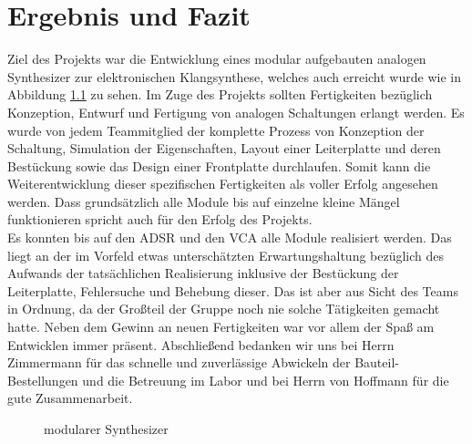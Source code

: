 \chapter{Ergebnis und Fazit}\label{ch:fazit}
Ziel des Projekts war die Entwicklung eines modular aufgebauten analogen Synthesizer zur elektronischen Klangsynthese, welches auch erreicht wurde wie in Abbildung \ref{fig:modularer Synthesizer} zu sehen.
Im Zuge des Projekts sollten Fertigkeiten bezüglich Konzeption, Entwurf und Fertigung von analogen Schaltungen erlangt werden.
Es wurde von jedem Teammitglied der komplette Prozess von Konzeption der Schaltung, Simulation der Eigenschaften, Layout einer Leiterplatte und deren Bestückung sowie das Design einer Frontplatte durchlaufen. Somit kann die Weiterentwicklung dieser spezifischen Fertigkeiten als voller Erfolg angesehen werden. Dass grundsätzlich alle Module bis auf einzelne kleine Mängel funktionieren spricht auch für den Erfolg des Projekts.\\
Es konnten bis auf den ADSR und den VCA alle Module realisiert werden. Das liegt an der im Vorfeld etwas unterschätzten Erwartungshaltung bezüglich des Aufwands der tatsächlichen Realisierung inklusive der Bestückung der Leiterplatte, Fehlersuche und Behebung dieser.  
Das ist aber aus Sicht des Teams in Ordnung, da der Großteil der Gruppe noch nie solche Tätigkeiten gemacht hatte.
Neben dem Gewinn an neuen Fertigkeiten war vor allem der Spaß am Entwicklen immer präsent.
Abschließend bedanken wir uns bei Herrn Zimmermann für das schnelle und zuverlässige Abwickeln der Bauteil-Bestellungen und die Betreuung im Labor und bei Herrn von Hoffmann für die gute Zusammenarbeit.


\begin{figure}[h]
	\centering
	\setlength{\fboxsep}{1pt} %
	\setlength{\fboxrule}{1pt} %
	\caption{modularer Synthesizer}
	\label{fig:modularer Synthesizer}
\end{figure}

